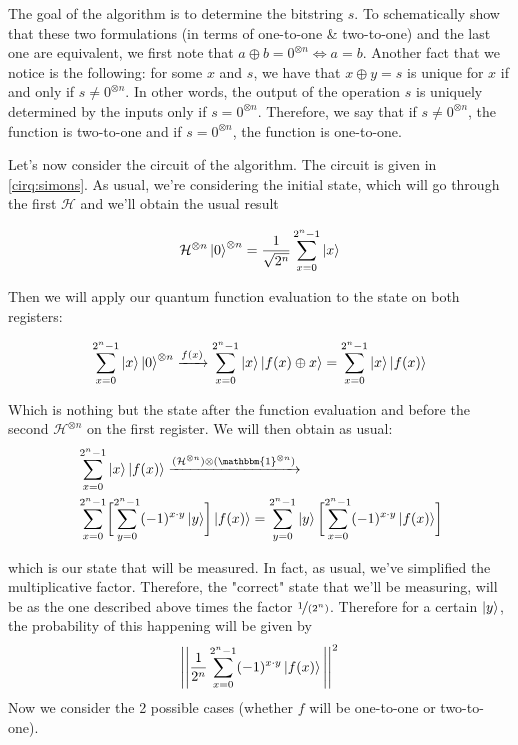 The goal of the algorithm is to determine the bitstring $s$. To schematically show that these two formulations (in terms of one-to-one \& two-to-one) 
and the last one are equivalent, we first note that $a \oplus b = 0^{\otimes n} \iff a=b$.
Another fact that we notice is the following: for some $x$ and $s$, we have that $x\oplus y = s$ is unique for $x$ if and only if $s \neq 0^{\otimes n}$. 
In other words, the output of the operation $s$ is uniquely determined by the inputs only if $s=0^{\otimes n}$. Therefore, 
we say that if $s\neq 0^{\otimes n}$, the function is two-to-one and if $s=0^{\otimes n}$, the function is one-to-one.

Let's now consider the circuit of the algorithm. The circuit is given in \autoref{cirq:simons}.
As usual, we're considering the initial state, which will go through the first $\mathcal{H}$ and we'll obtain the 
usual result 

\begin{align}
  \mathcal{H}^{\otimes n} \ket{0}^{\otimes n}=\frac{1}{\sqrt{2^n}}\sum_{x=0}^{2^n-1} \ket{x}
\end{align}

Then we will apply our quantum function evaluation to the state on both registers:

\begin{align}
  \sum_{x=0}^{2^n-1} \ket{x} \ket{0}^{\otimes n} \xrightarrow{f(x)} \sum_{x=0}^{2^n-1} \ket{x}\ket{f(x)\oplus x} =\sum_{x=0}^{2^n-1} \ket{x}\ket{f(x)} 
\end{align}

Which is nothing but the state after the function evaluation and before the second $\mathcal{H}^{\otimes n}$ on the first register. 
We will then obtain as usual:
\begin{align}
  &\sum_{x=0}^{2^n-1} \ket{x}\ket{f(x)} \xrightarrow{(\mathcal{H}^{\otimes n})\otimes (\mathbbm{1}^{\otimes n}) } \\ 
  &\sum_{x=0}^{2^n-1} \biggl[ \sum_{y=0}^{2^n-1} (-1)^{x\cdot y}\ket{y} \biggr] \ket{f(x)}=\sum_{y=0}^{2^n-1}\ket{y} \biggl[ \sum_{x=0}^{2^n-1}(-1)^{x\cdot y}\ket{f(x)} \biggr]
\end{align}

which is our state that will be measured. In fact, as usual, we've simplified the multiplicative factor. Therefore, the "correct" state that we'll be 
measuring, will be as the one described above times the factor $\nicefrac{1}{(2^n)}$. Therefore for a certain $\ket{y}$, the probability of this 
happening will be given by 
\begin{align}
  \Bigg| \Bigg| \frac{1}{2^n} \sum_{x=0}^{2^n-1} (-1)^{x\cdot y} \ket{f(x)} \Bigg| \Bigg|^2
  \label{eq:simons_last_meas}
\end{align}
Now we consider the 2 possible cases (whether $f$ will be one-to-one or two-to-one). 

